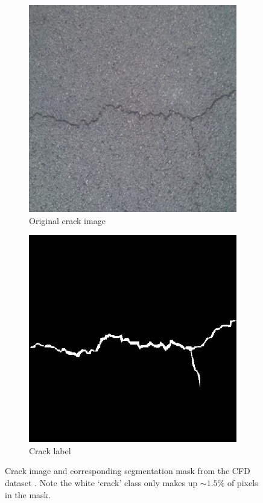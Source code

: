 \documentclass[a4paper,12pt]{report}
\begin{document}
\begin{figure}
    \centering
    \begin{subfigure}{.5\textwidth}
        \centering
        \includegraphics[width=0.8\linewidth]{res/dataset_CFD_029.png}
        \caption{Original crack image}
        \label{fig:crack-percentages-sub1}
    \end{subfigure}%
    \begin{subfigure}{.5\textwidth}
        \centering
        \includegraphics[width=0.8\linewidth]{res/dataset_CFD_029_label.png}
        \caption{Crack label}
        \label{fig:crack-percentages-sub2}
    \end{subfigure}
    \caption{Crack image and corresponding segmentation mask from the CFD dataset \cite{shi_automatic_2016}. Note the white `crack' class only makes up $\sim 1.5\%$ of pixels in the mask.}
    \label{fig:crack-percentages}
\end{figure}
\end{document}
